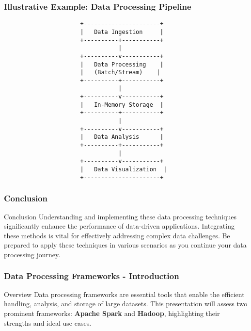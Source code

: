 \documentclass[aspectratio=169]{beamer}
\begin{document}
\begin{frame}[fragile]
    \frametitle{Illustrative Example: Data Processing Pipeline}
    \begin{center}
        \begin{verbatim}
                      +----------------------+
                      |   Data Ingestion     |
                      +----------+-----------+
                                 |
                      +----------v-----------+
                      |   Data Processing    |
                      |   (Batch/Stream)    |
                      +----------+-----------+
                                 |
                      +----------v-----------+
                      |   In-Memory Storage  |
                      +----------+-----------+
                                 |
                      +----------v-----------+
                      |   Data Analysis      |
                      +----------+-----------+
                                 |
                      +----------v-----------+
                      |   Data Visualization  |
                      +----------------------+
        \end{verbatim}
    \end{center}
\end{frame}

\begin{frame}[fragile]
    \frametitle{Conclusion}
    \begin{block}{Conclusion}
        Understanding and implementing these data processing techniques significantly enhance the performance of data-driven applications. Integrating these methods is vital for effectively addressing complex data challenges. Be prepared to apply these techniques in various scenarios as you continue your data processing journey.
    \end{block}
\end{frame}

\begin{frame}[fragile]
    \frametitle{Data Processing Frameworks - Introduction}
    \begin{block}{Overview}
        Data processing frameworks are essential tools that enable the efficient handling, analysis, and storage of large datasets. 
        This presentation will assess two prominent frameworks: 
        \textbf{Apache Spark} and \textbf{Hadoop}, highlighting their strengths and ideal use cases.
    \end{block}
\end{frame}
\end{document}
